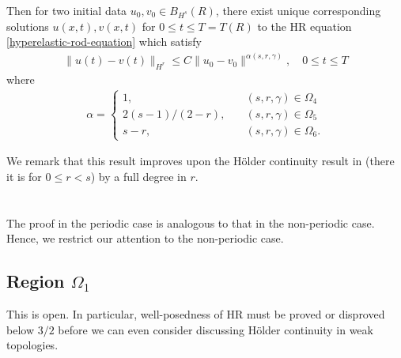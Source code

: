 \documentclass[a0,portrait]{a0poster}
\begin{document}
\begin{multicols}{3}
\begin{center}
\end{center}
%
%
Then for two initial data $u_{0}, v_{0} \in B_{H^{s}}(R)$, there exist unique
corresponding solutions $u(x,t), v(x,t)$ for $0 \le t \le T= T(R)$ to the
HR equation \eqref{hyperelastic-rod-equation} which satisfy 
%
%
\begin{equation*}
\begin{split}
  \| u(t) - v(t) \|_{H^{r}} \le C \| u_{0} - v_{0} \|^{\alpha(s, r, \gamma)},
  \quad 0
  \le t \le T
\end{split}
\end{equation*}
%
%
where 
%
%
\begin{equation*}
\begin{split}
\alpha = 
\begin{cases}
   1, \quad & (s,r, \gamma) \in \Omega_{4} 
  \\
   2(s-1)/(2-r),  \quad & (s, r, \gamma) \in \Omega_{5}
  \\
   s-r, \quad & (s, r, \gamma) \in \Omega_{6}.
\end{cases}
\end{split}
\end{equation*}

%
%
%
%
%
%
%
We remark that this result improves upon the H\"older continuity result in
\cite{Chen:2011fk} (there it is for $0 \le r < s$) by a full degree in $r$. 



\section*{}
%
%
The proof in the periodic case is analogous to that in the non-periodic case.
Hence, we restrict our attention to the non-periodic case. 
%
\subsection*{Region $\Omega_{1}$} 
\label{ssec:reg-2}
This is open. In particular, well-posedness of HR must be proved or disproved
below $3/2$ before we can even consider discussing H\"older continuity in weak
topologies.

\end{multicols}
\end{document}
